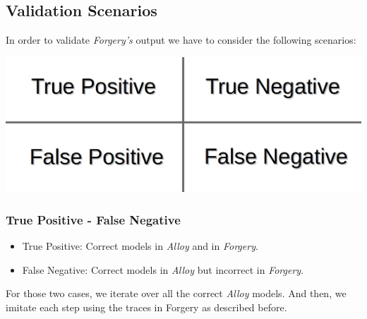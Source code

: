 \documentclass[oneside]{book}
\begin{document}
\newpage
\subsection{Validation Scenarios}

In order to validate \textit{Forgery's} output we have to consider the following scenarios:
\begin{center}
\includegraphics[scale=0.25]{scenarios}
\end{center}

\subsubsection{True Positive - False Negative}
\begin{itemize}
  \item True Positive: Correct models in \textit{Alloy} and in \textit{Forgery}.
  \item False Negative: Correct models in \textit{Alloy} but incorrect in \textit{Forgery}.
\end{itemize}

For those two cases, we iterate over all the correct \textit{Alloy} models. And then, we imitate each step using the traces in Forgery as described before.
\end{document}
